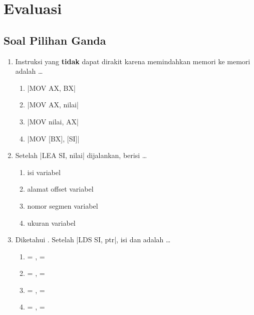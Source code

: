 \section{Evaluasi}
\label{sec:evaluasi-bab8}

\subsection{Soal Pilihan Ganda}

\begin{enumerate}
    \item Instruksi yang \textbf{tidak} dapat dirakit karena
          memindahkan memori ke memori adalah \dots
          \begin{enumerate}
              \item \lstasm|MOV AX, BX|
              \item \lstasm|MOV AX, nilai|
              \item \lstasm|MOV nilai, AX|
              \item \lstasm|MOV [BX], [SI]|
          \end{enumerate}

    \item Setelah \lstasm|LEA SI, nilai| dijalankan, 
          berisi \dots
          \begin{enumerate}
              \item isi variabel 
              \item alamat offset variabel 
              \item nomor segmen variabel 
              \item ukuran variabel 
          \end{enumerate}

    \item Diketahui . Setelah
          \lstasm|LDS SI, ptr|, isi  dan  adalah
          \dots
          \begin{enumerate}
              \item {} = ,  = 
              \item {} = ,  = 
              \item {} = ,  = 
              \item {} = ,  = 
          \end{enumerate}


\end{enumerate}
